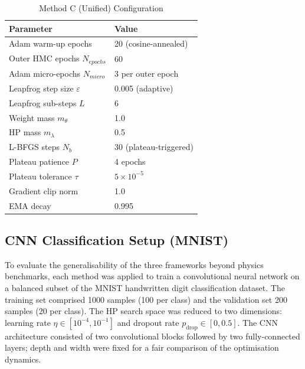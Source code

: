\documentclass[12pt,a4paper]{article}
\begin{document}
\begin{table}[tb]
\centering
\caption{Method C (Unified) Configuration}
\label{tab:setup_c}
\renewcommand{\arraystretch}{1.2}
\begin{tabular}{ll}
\toprule
Parameter & Value \\
\midrule
Adam warm-up epochs              & 20 (cosine-annealed) \\
Outer HMC epochs $N_{epochs}$   & 60 \\
Adam micro-epochs $N_{micro}$   & 3 per outer epoch \\
Leapfrog step size $\varepsilon$ & 0.005 (adaptive) \\
Leapfrog sub-steps $L$          & 6 \\
Weight mass $m_\theta$           & 1.0 \\
HP mass $m_\lambda$              & 0.5 \\
L-BFGS steps $N_b$               & 30 (plateau-triggered) \\
Plateau patience $P$             & 4 epochs \\
Plateau tolerance $\tau$         & $5 \times 10^{-5}$ \\
Gradient clip norm               & 1.0 \\
EMA decay                        & 0.995 \\
\bottomrule
\end{tabular}
\end{table}

\subsection{CNN Classification Setup (MNIST)}

To evaluate the generalisability of the three frameworks beyond
physics benchmarks, each method was applied to train a convolutional
neural network on a balanced subset of the MNIST handwritten digit
classification dataset.  The training set comprised 1000 samples (100
per class) and the validation set 200 samples (20 per class).  The HP
search space was reduced to two dimensions: learning rate
$\eta \in [10^{-4}, 10^{-1}]$ and dropout rate $p_{\mathrm{drop}} \in [0, 0.5]$.
The CNN architecture consisted of two convolutional blocks followed by
two fully-connected layers; depth and width were fixed for a fair
comparison of the optimisation dynamics.
\end{document}
